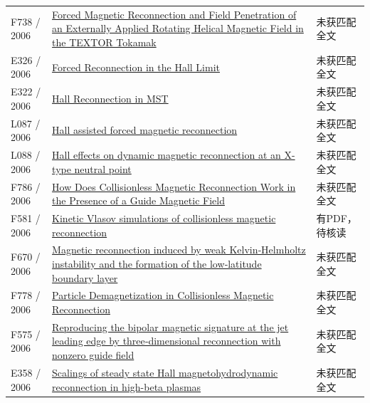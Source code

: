 \begin{longtable}{P{24mm}P{97mm}P{27mm}}
F738 / 2006 & \href{https://doi.org/10.1103/physrevlett.97.085003}{Forced Magnetic Reconnection and Field Penetration of an Externally Applied Rotating Helical Magnetic Field in the TEXTOR Tokamak} & 未获匹配全文\\

E326 / 2006 & \href{http://ui.adsabs.harvard.edu/abs/2006AGUFMSM41A1443H/abstract}{Forced Reconnection in the Hall Limit} & 未获匹配全文\\

E322 / 2006 & \href{http://absimage.aps.org/image/DPP06/MWS_DPP06-2006-001101.pdf}{Hall Reconnection in MST} & 未获匹配全文\\

L087 / 2006 & \href{https://doi.org/10.1063/1.2398933}{Hall assisted forced magnetic reconnection} & 未获匹配全文\\

L088 / 2006 & \href{https://doi.org/10.1051/0004-6361:20054391}{Hall effects on dynamic magnetic reconnection at an X-type neutral point} & 未获匹配全文\\

F786 / 2006 & \href{http://absimage.aps.org/image/DPP05/MWS_DPP05-2005-020014.pdf}{How Does Collisionless Magnetic Reconnection Work in the Presence of a Guide Magnetic Field} & 未获匹配全文\\

F581 / 2006 & \href{https://doi.org/10.1063/1.2347101}{Kinetic Vlasov simulations of collisionless magnetic reconnection} & 有PDF，待核读\\

F670 / 2006 & \href{https://doi.org/10.1029/2006gl026318}{Magnetic reconnection induced by weak Kelvin‐Helmholtz instability and the formation of the low‐latitude boundary layer} & 未获匹配全文\\

F778 / 2006 & \href{https://ntrs.nasa.gov/search.jsp?R=20060013113}{Particle Demagnetization in Collisionless Magnetic Reconnection} & 未获匹配全文\\

F575 / 2006 & \href{https://doi.org/10.1029/2005ja011521}{Reproducing the bipolar magnetic signature at the jet leading edge by three‐dimensional reconnection with nonzero guide field} & 未获匹配全文\\

E358 / 2006 & \href{https://doi.org/10.1063/1.2218815}{Scalings of steady state Hall magnetohydrodynamic reconnection in high-beta plasmas} & 未获匹配全文\\


\end{longtable}
